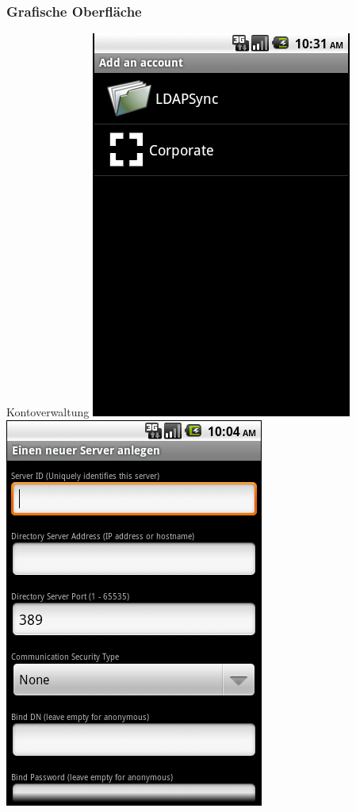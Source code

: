 \documentclass[hyperref={bookmarksopen=false}]{beamer}
\begin{document}
\begin{frame}[fragile]
	\frametitle{Grafische Oberfläche}
	\begin{block}{Kontoverwaltung}
	\hspace{0.5 cm}
	\includegraphics[scale=0.3]{Add_Account_AccountsandSync.png}
	\vspace{1 cm}
	\includegraphics[scale=0.3]{Add_Account1.png}

\end{block}
\end{frame}
\end{document}

